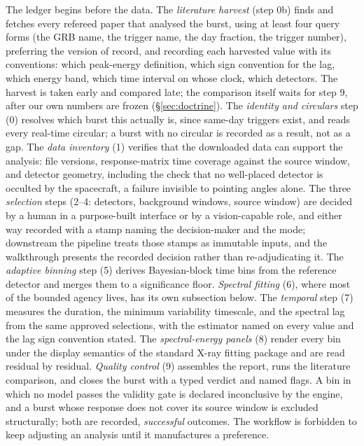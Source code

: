 The ledger begins before the data. The \emph{literature harvest} (step 0b)
finds and fetches every refereed paper that analysed the burst, using at
least four query forms (the GRB name, the trigger name, the day fraction, the trigger
number), preferring the version of record, and recording each harvested
value with its conventions: which peak-energy definition, which sign
convention for the lag, which energy band, which time interval on whose
clock, which detectors. The harvest is taken early and compared late; the
comparison itself waits for step 9, after our own numbers are frozen
(\S\ref{sec:doctrine}). The \emph{identity and circulars} step (0)
resolves which burst this actually is, since same-day triggers exist, and
reads every real-time circular; a burst with no circular is recorded as a
result, not as a gap. The \emph{data inventory} (1) verifies that the
downloaded data can support the analysis: file versions, response-matrix
time coverage against the source window, and detector geometry, including
the check that no well-placed detector is occulted by the spacecraft, a
failure invisible to pointing angles alone. The three \emph{selection}
steps (2--4: detectors, background windows, source window) are decided by a
human in a purpose-built interface or by a vision-capable role, and either
way recorded with a stamp naming the decision-maker and the mode; downstream
the pipeline treats those stamps as immutable inputs, and the walkthrough
presents the recorded decision rather than re-adjudicating it. The
\emph{adaptive binning} step (5) derives Bayesian-block time bins from the
reference detector and merges them to a significance floor. \emph{Spectral
fitting} (6), where most of the bounded agency lives, has its own
subsection below. The \emph{temporal} step (7) measures the duration, the
minimum variability timescale, and the spectral lag from the same approved
selections, with the estimator named on every value and the lag sign
convention stated. The \emph{spectral-energy panels} (8) render every bin
under the display semantics of the standard X-ray fitting package and are
read residual by residual. \emph{Quality control} (9) assembles the report,
runs the literature comparison, and closes the burst with a typed verdict
and named flags. A bin in which no model passes the validity gate is
declared inconclusive by the engine, and a burst whose response does not
cover its source window is excluded structurally; both are recorded,
\emph{successful} outcomes. The workflow is forbidden to keep adjusting an
analysis until it manufactures a preference.

